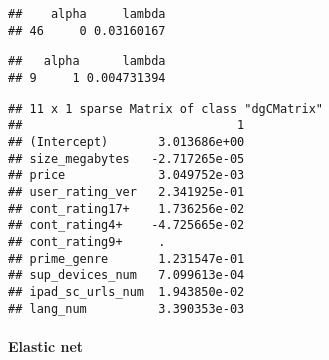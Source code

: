 \documentclass[]{article}
\newenvironment{Shaded}{\begin{snugshade}}{\end{snugshade}}
\newcommand{\KeywordTok}[1]{\textcolor[rgb]{0.13,0.29,0.53}{\textbf{#1}}}
\newcommand{\CommentTok}[1]{\textcolor[rgb]{0.56,0.35,0.01}{\textit{#1}}}
\newcommand{\OperatorTok}[1]{\textcolor[rgb]{0.81,0.36,0.00}{\textbf{#1}}}
\newcommand{\NormalTok}[1]{#1}
\let\oldparagraph\paragraph
\renewcommand{\paragraph}[1]{\oldparagraph{#1}\mbox{}}
\begin{document}
\begin{Shaded}
\end{Shaded}

\begin{verbatim}
##    alpha     lambda
## 46     0 0.03160167
\end{verbatim}

\begin{Shaded}
\end{Shaded}

\begin{verbatim}
##   alpha      lambda
## 9     1 0.004731394
\end{verbatim}

\begin{Shaded}
\end{Shaded}

\begin{verbatim}
## 11 x 1 sparse Matrix of class "dgCMatrix"
##                              1
## (Intercept)       3.013686e+00
## size_megabytes   -2.717265e-05
## price             3.049752e-03
## user_rating_ver   2.341925e-01
## cont_rating17+    1.736256e-02
## cont_rating4+    -4.725665e-02
## cont_rating9+     .           
## prime_genre       1.231547e-01
## sup_devices_num   7.099613e-04
## ipad_sc_urls_num  1.943850e-02
## lang_num          3.390353e-03
\end{verbatim}

\paragraph{Elastic net}\label{elastic-net}
\end{document}
